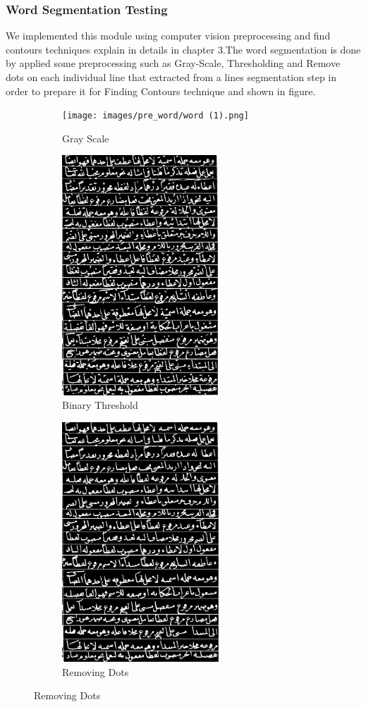 \subsubsection{Word Segmentation Testing}
We implemented this module using computer vision preprocessing and find contours techniques explain in details in chapter 3.The word segmentation is done by applied some preprocessing such as Gray-Scale, Thresholding and Remove dots on each individual line that extracted from a lines segmentation step in order to prepare it for Finding Contours technique and shown in figure.
\begin{figure}[H]
     \centering%
     \begin{subfigure}[b]{0.3\textwidth}
         \centering
         \texttt{[image: images/pre\_word/word (1).png]}
         \caption{Gray Scale}
         \label{fig:test-word_Gray_Scale}
     \end{subfigure}
     \hfill
      \begin{subfigure}[b]{0.3\textwidth}
         \centering
         \includegraphics[width=\textwidth, height=9cm]{images/pre_word/word2.png}
         \caption{Binary Threshold}
         \label{fig:test-word_Binary}
     \end{subfigure}
     \hfill%
      \begin{subfigure}[b]{0.3\textwidth}
         \centering
         \includegraphics[width=\textwidth, height=9cm]{images/pre_word/word3.png}
         \caption{Removing Dots}
         \label{fig:test_Removing-Dots}
     \end{subfigure}


\end{figure}
